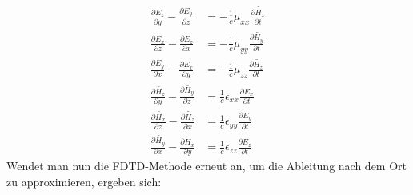 \documentclass[11pt, ngerman]{article}
\begin{document}
\begin{align}
	\frac{\partial E_z}{\partial y} - \frac{\partial E_y}{\partial z} &= -\frac{1}{c}\mu_{xx}\frac{\partial\widetilde{H_x}}{\partial t}\\
	\frac{\partial E_x}{\partial z} - \frac{\partial E_z}{\partial x} &= -\frac{1}{c}\mu_{yy}\frac{\partial\widetilde{H_y}}{\partial t}\\
	\frac{\partial E_y}{\partial x} - \frac{\partial E_x}{\partial y} &= -\frac{1}{c}\mu_{zz}\frac{\partial\widetilde{H_z}}{\partial t}\\
	\frac{\partial \widetilde{H_z}}{\partial y} - \frac{\partial\widetilde{H_y}}{\partial z} &= \frac{1}{c}\epsilon_{xx}\frac{\partial E_x}{\partial t}\\
	\frac{\partial \widetilde{H_x}}{\partial z} - \frac{\partial \widetilde{H_z}}{\partial x} &= \frac{1}{c}\epsilon_{yy}\frac{\partial E_y}{\partial t}\\
	\frac{\partial \widetilde{H_y}}{\partial x} - \frac{\partial\widetilde{H_x}}{\partial y} &= \frac{1}{c}\epsilon_{zz}\frac{\partial E_z}{\partial t}
\end{align}
Wendet man nun die FDTD-Methode erneut an, um die Ableitung nach dem Ort zu approximieren, ergeben sich:
\end{document}
